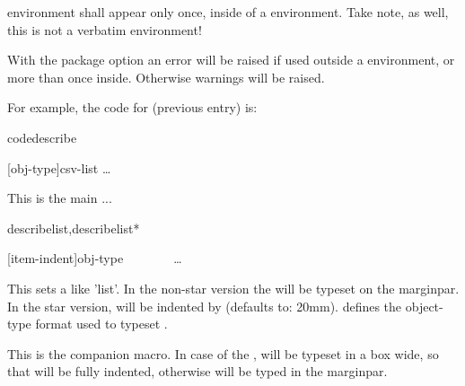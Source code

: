\documentclass{article}
\begin{document}
\begin{tsremark}
 environment shall appear only once, inside of a  environment. 
 Take note, as well, this is not a verbatim environment!
\end{tsremark}
\begin{tsremark}
With the  package option
an error will be raised if used outside a  environment, or more than once inside. Otherwise warnings will be raised.
\end{tsremark}

For example, the code for   (previous entry) is:

\begin{codestore}[demoD]
\begin{codedescribe}[env,new=2023/05/01,update=2023/05/01,note={a note example},update=2024/02/16,update=2025/09/25]{codedescribe}
  \begin{codesyntax}
    \tsmacro{\begin{codedescribe}}[obj-type]{csv-list}
    \ldots
    \tsmacro{\end{codedescribe}}{}
  \end{codesyntax}
  This is the main ...
\end{codedescribe}
\end{codestore}  


\begin{codedescribe}[env]{describelist,describelist*}
  \begin{codesyntax}
\tsmacro{\begin{describelist}}[item-indent]{obj-type}
  ~~
  ~~
  ~~\ldots
\tsmacro{\end{describelist}}{}
  \end{codesyntax}
This sets a  like 'list'. In the non-star version the  will be typeset on the marginpar. In the star version,  will be indented by  (defaults to: 20mm).
 defines the object-type format used to typeset . 
\end{codedescribe}

\begin{codedescribe}[code]{\describe}
\begin{codesyntax}
\end{codesyntax}
This is the  companion macro. In case of the ,  will be typeset in a box  wide, so that  will be fully indented, otherwise  will be typed in the marginpar.
\end{codedescribe}
\end{document}
